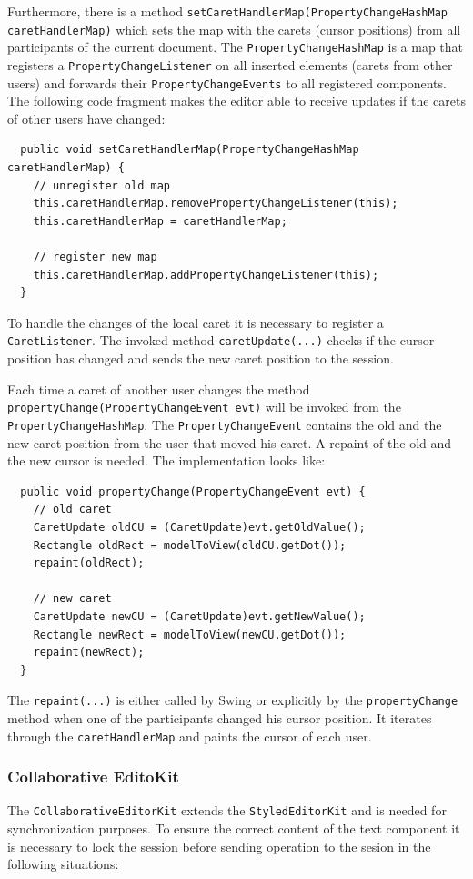 Furthermore, there is a method \texttt{setCaretHandlerMap(PropertyChangeHashMap caretHandlerMap)} which sets the map with the carets (cursor positions) from all participants of the current document. The \texttt{PropertyChangeHashMap} is a map that registers a \texttt{PropertyChangeListener} on all inserted elements (carets from other users) and forwards their \texttt{PropertyChangeEvents} to all registered components. The following code fragment makes the editor able to receive updates if the carets of other users have changed:

\begin{verbatim}
  public void setCaretHandlerMap(PropertyChangeHashMap caretHandlerMap) {
    // unregister old map
    this.caretHandlerMap.removePropertyChangeListener(this);
    this.caretHandlerMap = caretHandlerMap;

    // register new map
    this.caretHandlerMap.addPropertyChangeListener(this);
  }
\end{verbatim}

To handle the changes of the local caret it is necessary to register a \texttt{CaretListener}. The invoked method \texttt{caretUpdate(...)} checks if the cursor position has changed and sends the new caret position to the session.

Each time a caret of another user changes the method \texttt{propertyChange(PropertyChangeEvent evt)} will be invoked from the \texttt{Property\-Change\-Hash\-Map}. The \texttt{Property\-Change\-Event} contains the old and the new caret position from the user that moved his caret. A repaint of the old and the new cursor is needed. The implementation looks like:

\begin{verbatim}
  public void propertyChange(PropertyChangeEvent evt) {
    // old caret
    CaretUpdate oldCU = (CaretUpdate)evt.getOldValue();
    Rectangle oldRect = modelToView(oldCU.getDot());
    repaint(oldRect);

    // new caret
    CaretUpdate newCU = (CaretUpdate)evt.getNewValue();
    Rectangle newRect = modelToView(newCU.getDot());
    repaint(newRect);
  }
\end{verbatim}

The \texttt{repaint(...)} is either called by Swing or explicitly by the \texttt{propertyChange} method when one of the participants changed his cursor position. It iterates through the \texttt{caretHandlerMap} and paints the cursor of each user.

\subsubsection{Collaborative EditoKit}
\label{collaborative_editor_kit}
The \texttt{Collaborative\-Editor\-Kit} extends the \texttt{Styled\-Editor\-Kit} and is needed for synchronization purposes. To ensure the correct content of the text component it is necessary to lock the session before sending operation to the sesion in the following situations:

